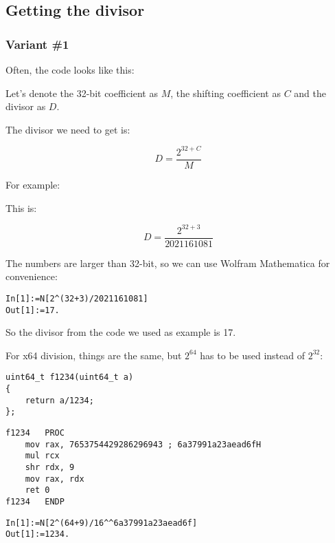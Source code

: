 ﻿\subsection{Getting the divisor}

\subsubsection{Variant \#1}

Often, the code looks like this:



Let's denote the 32-bit  coefficient as $M$, the shifting coefficient as $C$ and the divisor as $D$.

The divisor we need to get is:

\[
D=\frac{2^{32 + C}}{M}
\]

For example:



This is:

\[
D=\frac{2^{32 + 3}}{2021161081}
\]


The numbers are larger than 32-bit, so we can use Wolfram Mathematica for convenience:

\begin{lstlisting}[caption=Wolfram Mathematica]
In[1]:=N[2^(32+3)/2021161081]
Out[1]:=17.
\end{lstlisting}

So the divisor from the code we used as example is 17.

For x64 division, things 
are the same, but $2^{64}$ has to be used instead of $2^{32}$:

\begin{lstlisting}
uint64_t f1234(uint64_t a)
{
	return a/1234;
};
\end{lstlisting}

\begin{lstlisting}[caption=\Optimizing MSVC 2012 x64]
f1234	PROC
	mov	rax, 7653754429286296943 ; 6a37991a23aead6fH
	mul	rcx
	shr	rdx, 9
	mov	rax, rdx
	ret	0
f1234	ENDP
\end{lstlisting}

\begin{lstlisting}[caption=Wolfram Mathematica]
In[1]:=N[2^(64+9)/16^^6a37991a23aead6f]
Out[1]:=1234.
\end{lstlisting}

